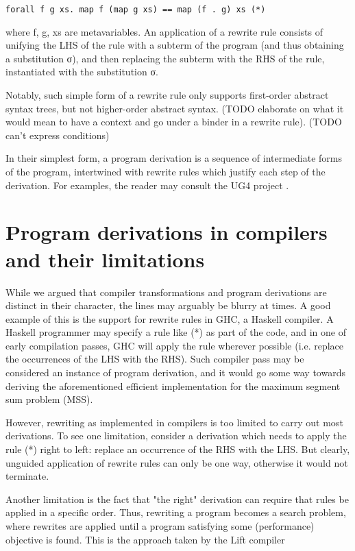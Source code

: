 \documentclass[bsc,frontabs,oneside,singlespacing,parskip,deptreport]{infthesis}
\theoremstyle{definition}
\begin{document}
\begin{verbatim}
forall f g xs. map f (map g xs) == map (f . g) xs (*)
\end{verbatim}

where f, g, xs are metavariables. An application of a rewrite rule
consists of unifying the LHS of the rule with a subterm of the program
(and thus obtaining a substitution σ), and then replacing the
subterm with the RHS of the rule, instantiated with the substitution
σ.

Notably, such simple form of a rewrite rule only supports first-order
abstract syntax trees, but not higher-order abstract syntax. (TODO
elaborate on what it would mean to have a context and go under a
binder in a rewrite rule). (TODO can't express conditions)

In their simplest form, a program derivation is a sequence of
intermediate forms of the program, intertwined with rewrite rules
which justify each step of the derivation. For examples, the reader
may consult the UG4 project \cite{TODO}.

\section{Program derivations in compilers and their limitations}
\label{sec:progr-deriv-comp}

While we argued that compiler transformations and program derivations
are distinct in their character, the lines may arguably be blurry at
times. A good example of this is the support for rewrite rules in GHC,
a Haskell compiler. A Haskell programmer may specify a rule like (*)
as part of the code, and in one of early compilation passes, GHC will
apply the rule wherever possible (i.e. replace the occurrences of the
LHS with the RHS). Such compiler pass may be considered an instance of
program derivation, and it would go some way towards deriving the
aforementioned efficient implementation for the maximum segment sum
problem (MSS).

However, rewriting as implemented in compilers is too limited to carry
out most derivations. To see one limitation, consider a derivation
which needs to apply the rule (*) right to left: replace an occurrence
of the RHS with the LHS. But clearly, unguided application of rewrite
rules can only be one way, otherwise it would not terminate.

Another limitation is the fact that "the right" derivation can require
that rules be applied in a specific order. Thus, rewriting a program
becomes a search problem, where rewrites are applied until a program
satisfying some (performance) objective is found. This is the approach
taken by the Lift compiler \cite{TODO}
\end{document}
